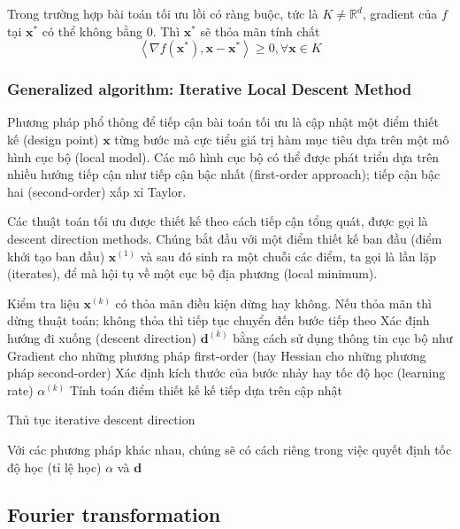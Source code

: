 Trong trường hợp bài toán tối ưu lồi có ràng buộc, tức là $K \ne \mathbb{R}^d$, gradient của $f$ tại $\mathbf{x}^{*}$ có thể không bằng 0. Thì $\mathbf{x}^{*}$ sẽ thỏa mãn tính chất
\begin{equation}
    \left<\nabla f(\mathbf{x}^{*}), \mathbf{x}-\mathbf{x}^{*}\right> \geq 0, \forall \mathbf{x} \in K
\end{equation}

\subsubsection{Generalized algorithm: Iterative Local Descent Method}

Phương pháp phổ thông để tiếp cận bài toán tối ưu là cập nhật một điểm thiết kế (design point) $\mathbf{x}$ từng bước mà cực tiểu giá trị hàm mục tiêu dựa trên một mô hình cục bộ (local model). Các mô hình cục bộ có thể được phát triển dựa trên nhiều hướng tiếp cận như tiếp cận bậc nhất (first-order approach); tiếp cận bậc hai (second-order) xấp xỉ Taylor.

Các thuật toán tối ưu được thiết kế theo cách tiếp cận tổng quát, được gọi là descent direction methods. Chúng bắt đầu với một điểm thiết kế ban đầu (điểm khởi tạo ban đầu) $\mathbf{x}^{(1)}$ và sau đó sinh ra một chuỗi các điểm, ta gọi là lần lặp (iterates), để mà hội tụ về một cục bộ địa phương (local minimum).

\begin{algorithm}[htp]
\begin{algorithmic}[1]
    \State Kiểm tra liệu $\mathbf{x}^{(k)}$ có thỏa mãn điều kiện dừng hay không. Nếu thỏa mãn thì dừng thuật toán; không thỏa thì tiếp tục chuyển đến bước tiếp theo\;
    \State Xác định hướng đi xuống (descent direction) $\mathbf{d}^{(k)}$ bằng cách sử dụng thông tin cục bộ như Gradient cho những phương pháp first-order (hay Hessian cho những phương pháp second-order)\;
    \State Xác định kích thước của bước nhảy hay tốc độ học (learning rate) $\alpha^{(k)}$\;
    \State Tính toán điểm thiết kế kế tiếp dựa trên cập nhật\;
\end{algorithmic}
\caption{{Thủ tục iterative descent direction}}
\label{algo:learning_algorithms}
\end{algorithm}

Với các phương pháp khác nhau, chúng sẽ có cách riêng trong việc quyết định tốc độ học (tỉ lệ học) $\alpha$ và $\mathbf{d}$

\subsection{Fourier transformation}

